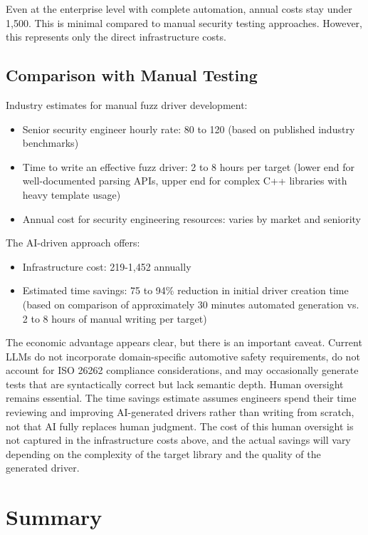 Even at the enterprise level with complete automation, annual costs stay under \texteuro{}1,500. This is minimal compared to manual security testing approaches. However, this represents only the direct infrastructure costs.


\subsection{Comparison with Manual Testing}
\label{sec:results_cost_manual}

Industry estimates for manual fuzz driver development:
\begin{itemize}
    \item Senior security engineer hourly rate: \texteuro{}80 to 120 (based on published industry benchmarks)
    \item Time to write an effective fuzz driver: 2 to 8 hours per target (lower end for well-documented parsing APIs, upper end for complex C++ libraries with heavy template usage)
    \item Annual cost for security engineering resources: varies by market and seniority
\end{itemize}

The AI-driven approach offers:
\begin{itemize}
    \item Infrastructure cost: \texteuro{}219-\texteuro{}1,452 annually
    \item Estimated time savings: 75 to 94\% reduction in initial driver creation time (based on comparison of approximately 30 minutes automated generation vs. 2 to 8 hours of manual writing per target)
\end{itemize}

The economic advantage appears clear, but there is an important caveat. Current LLMs do not incorporate domain-specific automotive safety requirements, do not account for ISO 26262 compliance considerations, and may occasionally generate tests that are syntactically correct but lack semantic depth. Human oversight remains essential. The time savings estimate assumes engineers spend their time reviewing and improving AI-generated drivers rather than writing from scratch, not that AI fully replaces human judgment. The cost of this human oversight is not captured in the infrastructure costs above, and the actual savings will vary depending on the complexity of the target library and the quality of the generated driver.


\section{Summary}
\label{sec:results_summary}

